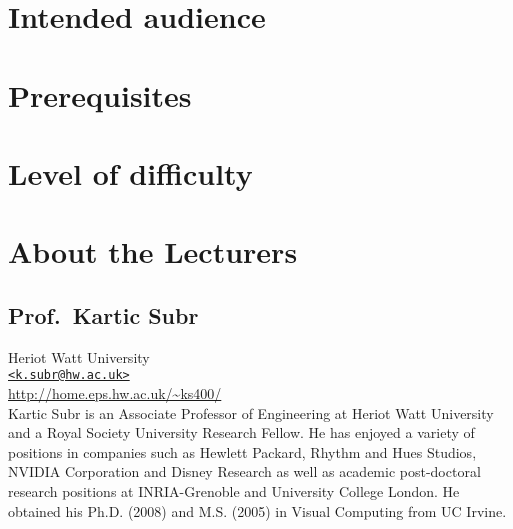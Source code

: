 \documentclass[11pt,fleqn]{book} %
\begin{document}
\section*{Intended audience}

\section*{Prerequisites}

\section*{Level of difficulty}
\clearpage



{}
\section*{About the Lecturers}

\subsection*{Prof.\ Kartic Subr}
Heriot Watt University\\
\href{<k.subr@hw.ac.uk>}{\texttt{<k.subr@hw.ac.uk>}}\\
\url{http://home.eps.hw.ac.uk/~ks400/}\\

Kartic Subr is an Associate Professor of Engineering at Heriot Watt University and a Royal Society University Research Fellow. He has enjoyed a variety of positions in companies such as Hewlett Packard, Rhythm and Hues Studios, NVIDIA Corporation and Disney Research as well as academic post-doctoral research positions at INRIA-Grenoble and University College London. He obtained his Ph.D. (2008) and M.S. (2005) in Visual Computing from UC Irvine. 
\end{document}
